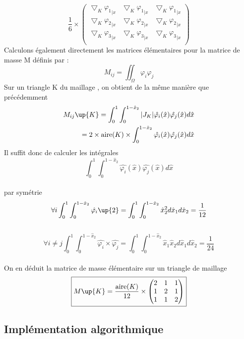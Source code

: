 \documentclass[a4paper,12pt,titlepage]{report}
\begin{document}
\begin{onehalfspace}
\[
\frac{1}{6}\times
	\begin{pmatrix}
   		\bigtriangledown_{K}{\varphi_1}_{|x} & \bigtriangledown_{K}{\varphi_1}_{|x} &  										    
   		\bigtriangledown_{K} {\varphi_1}_{|x} \\ 
    	\bigtriangledown_{K }{\varphi_2}_{|x} & \bigtriangledown_{K }{\varphi_2}_{|x} &  
    	\bigtriangledown_{K }{\varphi_2}_{|x} \\    										        
    	\bigtriangledown_{K}{\varphi_3}_{|x} & \bigtriangledown_{K}{\varphi_3}_{|x} & \bigtriangledown_{K}{\varphi_3}_{|x} \\ 
    \end{pmatrix} 
\]
\newline
Calculons également directement les matrices élémentaires pour la matrice de masse M définis par :
\[
M_{ij}=\iint_\Omega \varphi_i \varphi_j
\]
Sur un triangle K du maillage , on obtient de la même manière que précédemment 
\[
  \left.
    \begin{aligned}
		M_{ij}\up{K}=\int_0^{1}\int_0^{1-{\hat{x}}_2}|J_K|\hat{\varphi_i}(\hat{x})\hat{\varphi_j}(\hat{x})d\hat{x}\\
		=2\times\text{aire}(K)\times\int_0^{1-{\hat{x}}_2}\hat{\varphi_i}(\hat{x})\hat{\varphi_j}(\hat{x})d\hat{x}
    \end{aligned}
  \right.
\]
Il suffit donc de calculer les intégrales 
\[
	\int _0^{1}\int_0^{1-{\hat{x}}_2}\hat{\varphi_i}(\hat{x})\hat{\varphi_j}(\hat{x})d\hat{x}
\]
\\
par symétrie 
\[
	\forall i \int _0^{1}\int_0^{1-\hat{x}_{2}}\hat{\varphi_i}\up{2}= \int _0^{1} \int_0^{1-\hat{x}_{2}}\hat{x}_{2}^{2}d\hat{x}_{1}d\hat{x}_{2}=\frac{1}{12}
\]
\\%
\[
	\forall i \neq j \int _0^{1}\int_0^{1-{\hat{x}}_2}\hat{\varphi_i} \times \hat{\varphi_j}=\int _0^{1} \int_0^{1-\hat{x}_{2}}\hat{x}_{1}\hat{x}_{2}d\hat{x}_{1}d\hat{x}_{2}=\frac{1}{24}
\]
\\%
On en déduit la matrice de masse élémentaire sur un triangle de maillage 
\\%
\[
	\boxed{M\up{K}=\frac{\text{aire}(K)}{12}\times 
	\begin{pmatrix}
   		2 & 1 & 1 \\
   		1 &  2 & 1 \\
   		1 &  1 & 2
	\end{pmatrix}}
\]

\subsection{Implémentation algorithmique}


\end{onehalfspace}
\end{document}
